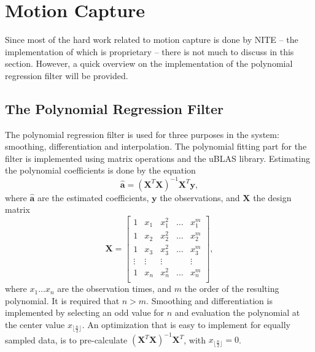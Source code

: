 \section{Motion Capture}
\label{sec:motion_capture_implementation}

Since most of the hard work related to motion capture
is done by NITE --
the implementation of which is proprietary --
there is not much to discuss in this section.
However, a quick overview on the implementation of the
polynomial regression filter will be provided.

\subsection{The Polynomial Regression Filter}

The polynomial regression filter is used for three purposes in the system:
smoothing, differentiation and interpolation.
The polynomial fitting part for the filter is implemented using
matrix operations and the uBLAS library.
Estimating the polynomial coefficients is done by the equation
\begin{equation}
\label{eq:sg_coefs}
\widehat{\mathbf{a}} = \left( \mathbf{X}^T \mathbf{X} \right)^{-1} \mathbf{X}^T \mathbf{y},
\end{equation}
where $\widehat{\mathbf{a}}$ are the estimated coefficients,
$\mathbf{y}$ the observations,
and $\mathbf{X}$ the design matrix
\begin{equation}
\label{eq:sg_design_matrix}
\mathbf{X} = \left[
\begin{array}{ccccc}
1 & x_1 & x_1^2 & \ldots & x_1^m \\
1 & x_2 & x_2^2 & \ldots & x_2^m \\
1 & x_3 & x_3^2 & \ldots & x_3^m \\
\vdots & \vdots & \vdots & & \vdots \\
1 & x_n & x_n^2 & \ldots & x_n^m \\
\end{array}
\right] ,
\end{equation}
where $x_1 \ldots x_n$ are the observation times,
and $m$ the order of the resulting polynomial.
It is required that $n > m$.
Smoothing and differentiation is implemented by
selecting an odd value for $n$
and evaluation the polynomial at the center value
$x_{\lfloor \frac{n}{2} \rfloor}$.
An optimization that is easy to implement for equally sampled data,
is to pre-calculate $\left( \mathbf{X}^T \mathbf{X} \right)^{-1} \mathbf{X}^T$,
with $x_{\lfloor \frac{n}{2} \rfloor} = 0$.
